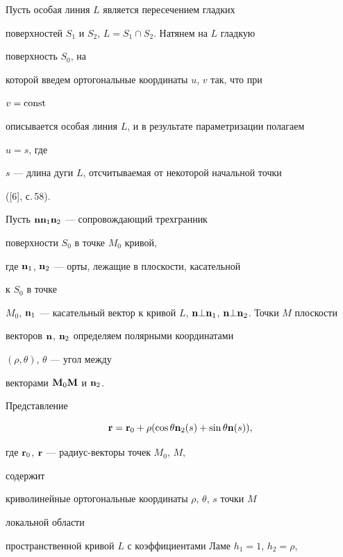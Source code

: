 \begin{pf} 


Пусть особая линия $L$ является пересечением гладких  


поверхностей $S_1$ и $S_2$, $L=S_1\cap S_2$. Натянем на $L$ гладкую 


поверхность $S_0$, на 


которой введем ортогональные координаты $u$, $v$ так, что при 


$v=\operatorname{const}$ 


описывается особая линия $L$, и в результате параметризации полагаем 


$u=s$, где  


$s$ --- длина дуги $L$, отсчитываемая от некоторой начальной точки 


([6], с.\,58). 


Пусть $\bold n\bold n_1\bold n_2$ --- сопровождающий трехгранник 


поверхности $S_0$ в точке $M_0$ кривой, 


где $\bold n_1$, $\bold n_2$ --- орты, лежащие в плоскости, касательной 


к $S_0$ в точке 


$M_0$, $\bold n_1$ --- касательный вектор к кривой $L$, $\bold 


n\bot\bold n_1$, $\bold n\bot\bold n_2$. Точки $M$ плоскости 


векторов $\bold n$, $\bold n_2$ определяем полярными координатами 


$(\rho,\theta)$, $\theta$ --- угол между 


векторами $\bold M_0\bold M$ и $\bold n_2$. 


 


Представление 


\begin{equation} 


\bold r=\bold r_0+\rho(\cos\theta\bold n_2(s)+\sin 


\theta\bold n(s)), 


\end{equation} 


где $\bold r_0$, $\bold r$ --- радиус-векторы точек $M_0$, $M$, 


содержит 


криволинейные ортогональные координаты $\rho$, $\theta$, $s$ точки $M$ 


локальной области  


пространственной кривой $L$ с коэффициентами Ламе $h_1=1$, $h_2=\rho$, 



\end{pf}
